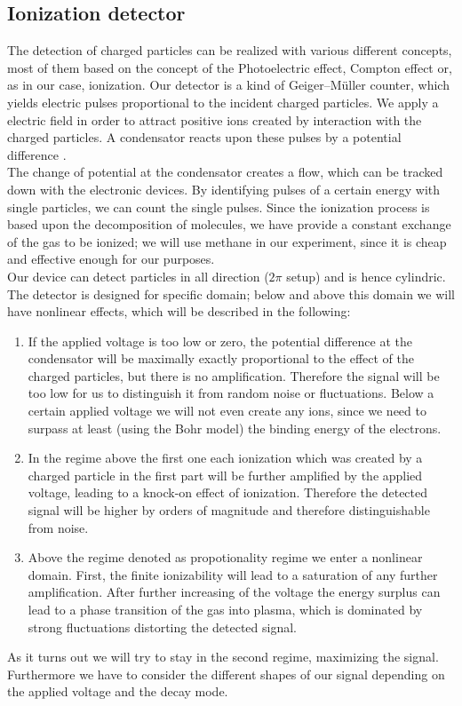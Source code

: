 \subsection{Ionization detector}
\label{subsec:detector}
The detection of charged particles can be realized with various different concepts, most of them based on
the concept of the Photoelectric effect, Compton effect or, as in our case, ionization. Our detector is a
kind of Geiger–Müller counter, which yields electric pulses proportional to the incident charged particles.
We apply a electric field in order to attract positive ions created by interaction with the charged particles.
A condensator reacts upon these pulses by a potential difference \cite{staatsexamen}. \\
The change of potential at the condensator
creates a flow, which can be tracked down with the electronic devices. By identifying pulses of a certain
energy with single particles, we can count the single pulses. Since the ionization process is based upon the
decomposition of molecules, we have provide a constant exchange of the gas to be ionized; we will use
methane in our experiment, since it is cheap and effective enough for our purposes\cite{staatsexamen}. \\
Our device can detect particles in all direction ($2\pi$ setup) and is hence cylindric.
The detector is designed for specific domain; below and above this domain we will have nonlinear effects,
which will be described in the following:
\begin{enumerate}
\item If the applied voltage is too low or zero, the potential difference at the condensator will be maximally
exactly proportional to the effect of the charged particles, but there is no amplification. Therefore the
signal will be too low for us to distinguish it from random noise or fluctuations. Below a certain 
applied voltage we will not even create any ions, since we need to surpass at least (using the Bohr model) the
binding energy of the electrons.
\item In the regime above the first one each ionization which was created by a charged particle in the first part will be further
amplified by the applied voltage, leading to a knock-on effect of ionization. Therefore the detected signal
will be higher by orders of magnitude and therefore distinguishable from noise.
\item Above the regime denoted as propotionality regime we enter a nonlinear domain. First, the finite 
ionizability will lead to a saturation of any further amplification. After further increasing of the voltage
the energy surplus can lead to a phase transition of the gas into plasma, which is dominated by strong
fluctuations distorting the detected signal.
\end{enumerate}
As it turns out we will try to stay in the second regime, maximizing the signal. Furthermore we have to
consider the different shapes of our signal depending on the applied voltage and the decay mode.
